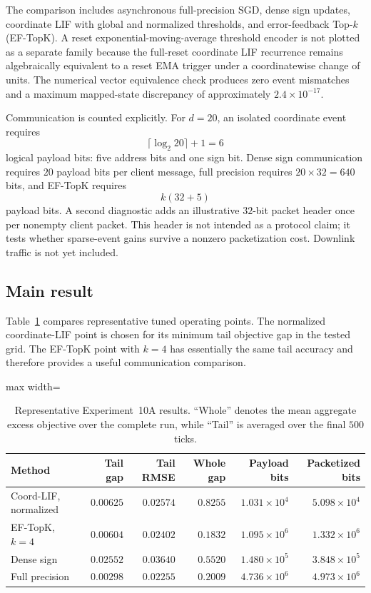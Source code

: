 The comparison includes asynchronous full-precision SGD, dense sign updates, coordinate LIF with global and normalized thresholds, and error-feedback Top-$k$ (EF-TopK). A reset exponential-moving-average threshold encoder is not plotted as a separate family because the full-reset coordinate LIF recurrence remains algebraically equivalent to a reset EMA trigger under a coordinatewise change of units. The numerical vector equivalence check produces zero event mismatches and a maximum mapped-state discrepancy of approximately $2.4\times10^{-17}$.

Communication is counted explicitly. For $d=20$, an isolated coordinate event requires
\begin{equation}
  \lceil\log_2 20\rceil+1=6
\end{equation}
logical payload bits: five address bits and one sign bit. Dense sign communication requires $20$ payload bits per client message, full precision requires $20\times32=640$ bits, and EF-TopK requires
\begin{equation}
  k(32+5)
\end{equation}
payload bits. A second diagnostic adds an illustrative $32$-bit packet header once per nonempty client packet. This header is not intended as a protocol claim; it tests whether sparse-event gains survive a nonzero packetization cost. Downlink traffic is not yet included.

\subsection{Main result}

Table~\ref{tab:exp10a_selected} compares representative tuned operating points. The normalized coordinate-LIF point is chosen for its minimum tail objective gap in the tested grid. The EF-TopK point with $k=4$ has essentially the same tail accuracy and therefore provides a useful communication comparison.

\begin{table}[ht]
  \centering
  \small
  \caption{Representative Experiment~10A results. ``Whole'' denotes the mean aggregate excess objective over the complete run, while ``Tail'' is averaged over the final $500$ ticks.}
  \label{tab:exp10a_selected}
  \begin{adjustbox}{max width=\textwidth}
\begin{tabular}{lrrrrr}
    \toprule
    Method & Tail gap & Tail RMSE & Whole gap & Payload bits & Packetized bits \\
    \midrule
    Coord-LIF, normalized & $0.00625$ & $0.02574$ & $0.8255$ & $1.031\times10^4$ & $5.098\times10^4$ \\
    EF-TopK, $k=4$ & $0.00604$ & $0.02402$ & $0.1832$ & $1.095\times10^6$ & $1.332\times10^6$ \\
    Dense sign & $0.02552$ & $0.03640$ & $0.5520$ & $1.480\times10^5$ & $3.848\times10^5$ \\
    Full precision & $0.00298$ & $0.02255$ & $0.2009$ & $4.736\times10^6$ & $4.973\times10^6$ \\
    \bottomrule
  \end{tabular}
\end{adjustbox}
\end{table}

